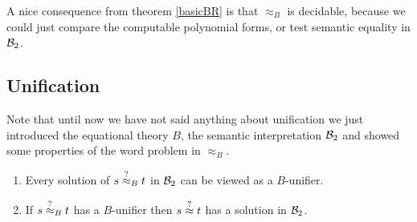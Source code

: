 		A nice consequence from theorem \ref{basicBR} is that $\approx_B$ is decidable, because we could just compare the computable polynomial forms, or test semantic equality in ${\mathcal{B}_2}$.
		\subsection{Unification}
		Note that until now we have not said anything about unification we just introduced the equational theory $B$, the semantic interpretation ${\mathcal{B}_2}$ and showed some properties of the word problem in $\approx_B$.
		\begin{lemma}\mbox{}
		\begin{enumerate}
		\item Every solution of $s\stackrel{?}{\approx}_B t$ in ${\mathcal{B}_2}$ can be viewed as a $B$-unifier.
		\item If $s\stackrel{?}{\approx}_B t$ has a $B$-unifier then $s\stackrel{?}{\approx} t$ has a solution in ${\mathcal{B}_2}$.
		\end{enumerate}
		\end{lemma}
